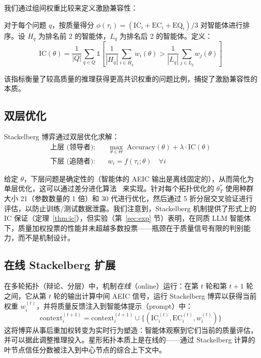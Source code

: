 我们通过组间权重比较来定义激励兼容性：

\begin{definition}[激励兼容性指标]
对于每个问题 $q$，按质量得分 $\phi(\tau_i) = (\text{IC}_i + \text{EC}_i + \text{EQ}_i)/3$ 对智能体进行排序。设 $H_q$ 为排名前 2 的智能体，$L_q$ 为排名后 2 的智能体。定义：
\begin{equation}
    \text{IC}(\theta) = \frac{1}{|Q|} \sum_{q \in Q} \mathbb{1}\!\left[\frac{1}{|H_q|}\sum_{i \in H_q} w_i(\theta) > \frac{1}{|L_q|}\sum_{j \in L_q} w_j(\theta)\right]
    \label{eq:ic_metric}
\end{equation}
\end{definition}

该指标衡量了较高质量的推理获得更高共识权重的问题比例，捕捉了激励兼容性的本质。

\subsection{双层优化}
\label{sec:bilevel}

Stackelberg 博弈通过双层优化求解：
\begin{align}
    \textbf{上层 (领导者):} \quad & \max_{\theta \in \Theta} \; \text{Accuracy}(\theta) + \lambda \cdot \text{IC}(\theta) \label{eq:upper} \\
    \textbf{下层 (追随者):} \quad & w_i = f(\tau_i; \theta) \quad \forall i \label{eq:lower}
\end{align}

给定 $\theta$，下层问题是确定性的（智能体的 AEIC 输出是离线固定的），从而简化为单层优化，这可以通过差分进化算法~\cite{storn1997differential} 来实现。针对每个拓扑优化的 $\theta^*_T$ 使用种群大小 21（参数数量的 1 倍）和 30 代进行优化，然后通过 5 折分层交叉验证进行评估，以防止训练/测试数据泄露。我们注意到，Stackelberg 机制提供了形式上的 IC 保证（定理~\ref{thm:ic}），但实验（第~\ref{sec:exp} 节）表明，在同质 LLM 智能体下，质量加权投票的性能并未超越多数投票——瓶颈在于质量信号有限的判别能力，而不是机制设计。

\subsection{在线 Stackelberg 扩展}
\label{sec:online_sg}

在多轮拓扑（辩论、分层）中，机制\emph{在线}（online）运行：在第 $t$ 轮和第 $t{+}1$ 轮之间，它从第 $t$ 轮的输出计算中间 AEIC 信号，运行 Stackelberg 博弈以获得当前权重 $w_i^{(t)}$，并将质量反馈注入到智能体提示（prompt）中：
\begin{equation}
    \text{context}_i^{(t+1)} = \text{context}_i^{(t+1)} \cup \{(\text{IC}_i^{(t)}, \text{EC}_i^{(t)}, w_i^{(t)})\}
\end{equation}
这将博弈从事后重加权转变为实时行为塑造：智能体观察到它们当前的质量评估，并可以据此调整推理投入。星形拓扑本质上是在线的——通过 Stackelberg 计算的叶节点信任分数被注入到中心节点的综合上下文中。

